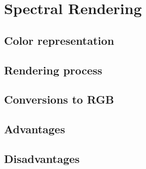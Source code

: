 \chapter{Spectral Rendering}

\section{Color representation}

\section{Rendering process}

\section{Conversions to RGB}

\section{Advantages}

\section{Disadvantages}
